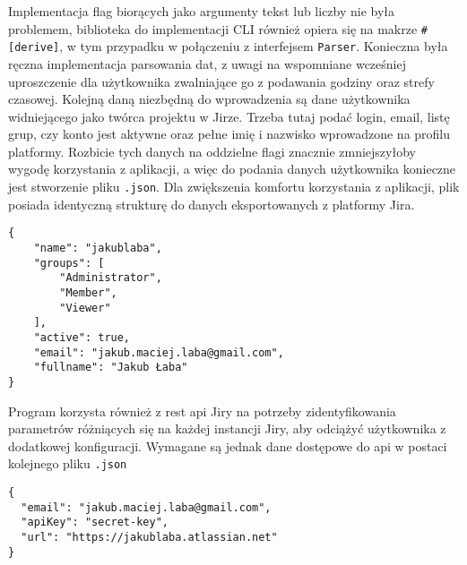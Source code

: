 Implementacja flag biorących jako argumenty tekst lub liczby nie była problemem, biblioteka do implementacji CLI również opiera się na makrze
\texttt{\#[derive]}, w tym przypadku w połączeniu z interfejsem \texttt{Parser}.
Konieczna była ręczna implementacja parsowania dat, z uwagi na wspomniane wcześniej uproszczenie dla użytkownika zwalniające go z podawania godziny oraz strefy czasowej.
Kolejną daną niezbędną do wprowadzenia są dane użytkownika widniejącego jako twórca projektu w Jirze.
Trzeba tutaj podać login, email, listę grup, czy konto jest aktywne oraz pełne imię i nazwisko wprowadzone na profilu platformy.
Rozbicie tych danych na oddzielne flagi znacznie zmniejszyłoby wygodę korzystania z aplikacji, a więc do podania danych użytkownika konieczne jest stworzenie pliku \texttt{.json}.
Dla zwiększenia komfortu korzystania z aplikacji, plik posiada identyczną strukturę do danych eksportowanych z platformy Jira.
\begin{lstlisting}[caption=Przykładowy plik z danymi użytkownika]
{
    "name": "jakublaba",
    "groups": [
        "Administrator",
        "Member",
        "Viewer"
    ],
    "active": true,
    "email": "jakub.maciej.laba@gmail.com",
    "fullname": "Jakub Łaba"
}
\end{lstlisting}

Program korzysta również z rest api Jiry na potrzeby zidentyfikowania parametrów różniących się na każdej instancji Jiry, aby odciążyć użytkownika z dodatkowej konfiguracji.
Wymagane są jednak dane dostępowe do api w postaci kolejnego pliku \texttt{.json}
\begin{lstlisting}[caption=Przykładowy plik z danymi dostępowymi do api Jiry]
{
  "email": "jakub.maciej.laba@gmail.com",
  "apiKey": "secret-key",
  "url": "https://jakublaba.atlassian.net"
}
\end{lstlisting}
